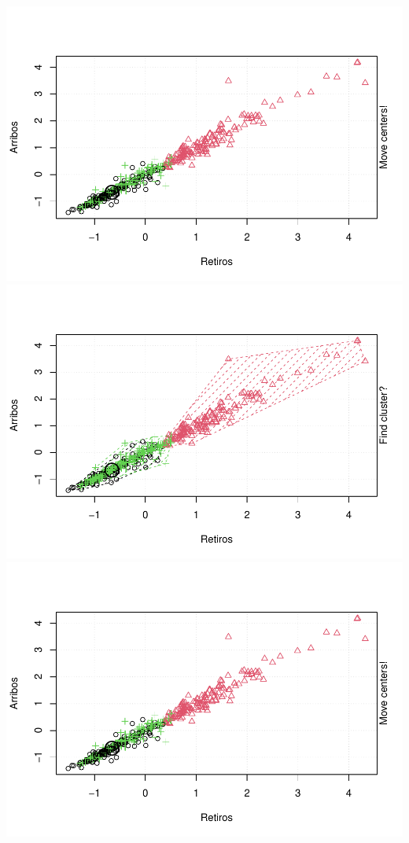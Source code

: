 \documentclass[
]{article}
\begin{document}
\includegraphics{Ecobici_files/figure-latex/unnamed-chunk-12-13.pdf}
\includegraphics{Ecobici_files/figure-latex/unnamed-chunk-12-14.pdf}
\includegraphics{Ecobici_files/figure-latex/unnamed-chunk-12-15.pdf}
\end{document}
